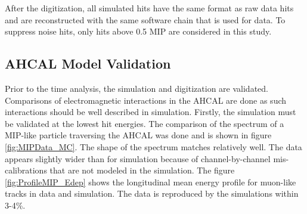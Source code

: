\documentclass{JINST}
\begin{document}
After the digitization, all simulated hits have the same format as raw data hits and are reconstructed with the same software chain that is used for data. To suppress noise hits, only hits above 0.5 MIP are considered in this study.

\subsection{AHCAL Model Validation}

Prior to the time analysis, the simulation and digitization are validated. Comparisons of electromagnetic interactions in the AHCAL are done as such interactions should be well described in simulation. Firstly, the simulation must be validated at the lowest hit energies. The comparison of the spectrum of a MIP-like particle traversing the AHCAL was done and is shown in figure \ref{fig:MIPData_MC}. The shape of the spectrum matches relatively well. The data appears slightly wider than for simulation because of channel-by-channel mis-calibrations that are not modeled in the simulation. The figure \ref{fig:ProfileMIP_Edep} shows the longitudinal mean energy profile for muon-like tracks in data and simulation. The data is reproduced by the simulations within 3-4\%.
\end{document}
